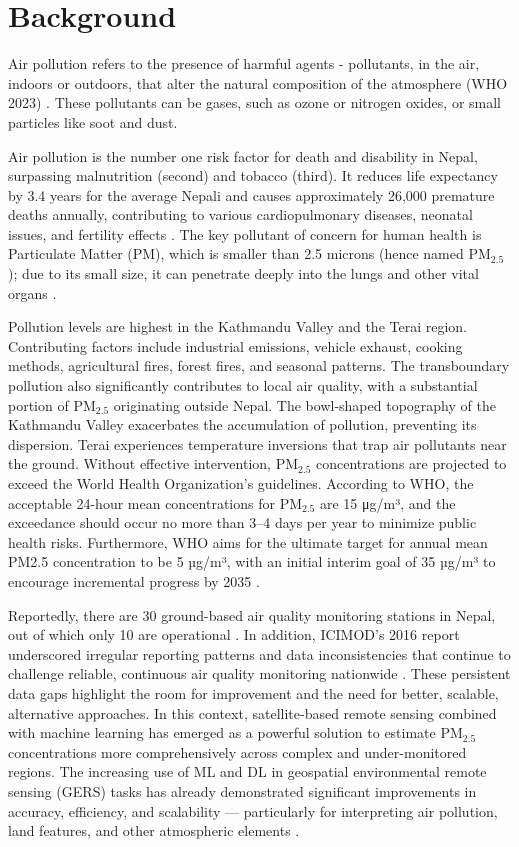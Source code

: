\documentclass[12pt]{report}
\begin{document}
\section{Background}

Air pollution refers to the presence of harmful agents - pollutants, in the air, indoors or outdoors, that alter the natural composition of the atmosphere (WHO 2023) \cite{WHO2023AirPollution}. These pollutants can be gases, such as ozone or nitrogen oxides, or small particles like soot and dust. 


Air pollution is the number one risk factor for death and disability in Nepal, surpassing malnutrition
(second) and tobacco (third). It reduces life expectancy by 3.4 years for the average Nepali and causes
approximately 26,000 premature deaths annually, contributing to various cardiopulmonary diseases, neonatal issues, and fertility effects \cite{worldbank2025cleanair}. The key pollutant of concern for human health is Particulate Matter (PM), which is smaller than
2.5 microns (hence named PM$_{2.5}$); due to its small size, it can penetrate deeply into the lungs and other vital organs \cite{Anderson2011ClearingTA}.

 Pollution levels are highest in the Kathmandu Valley and the Terai region. Contributing factors include industrial emissions, vehicle exhaust, cooking methods, agricultural fires, forest fires, and seasonal patterns. The transboundary pollution also significantly contributes to local air quality, with a substantial portion of PM$_{2.5}$ originating outside Nepal. The bowl-shaped topography of the Kathmandu Valley exacerbates the accumulation of pollution, preventing its dispersion. Terai experiences temperature inversions that
trap air pollutants near the ground. Without effective intervention, PM$_{2.5}$ concentrations are projected to exceed the World Health Organization's guidelines. According to WHO, the acceptable 24-hour mean concentrations for PM$_{2.5}$ are 15 μg/m³, and the exceedance should occur no more than 3–4 days per year to minimize public health risks. Furthermore, WHO aims for the ultimate target for
annual mean PM2.5 concentration to be 5 µg/m³, with an initial interim goal of 35 µg/m³ to encourage incremental
progress by 2035 \cite{worldbank2025cleanair}\cite{Kathmandupost2025}.

Reportedly, there are 30 ground-based air quality monitoring stations in Nepal, out of which only 10 are operational \cite{doe2024}. In addition, ICIMOD’s 2016 report underscored irregular reporting patterns and data inconsistencies that continue to challenge reliable, continuous air quality monitoring nationwide \cite{icimod2016}. These persistent data gaps highlight the room for improvement and the need for better, scalable, alternative approaches. In this context, satellite-based remote sensing combined with machine learning has emerged as a powerful solution to estimate PM$_{2.5}$ concentrations more comprehensively across complex and under-monitored regions. The increasing use of ML and DL in geospatial environmental remote sensing (GERS) tasks has already demonstrated significant improvements in accuracy, efficiency, and scalability — particularly for interpreting air pollution, land features, and other atmospheric elements \cite{Han2023ASO}.
\end{document}
